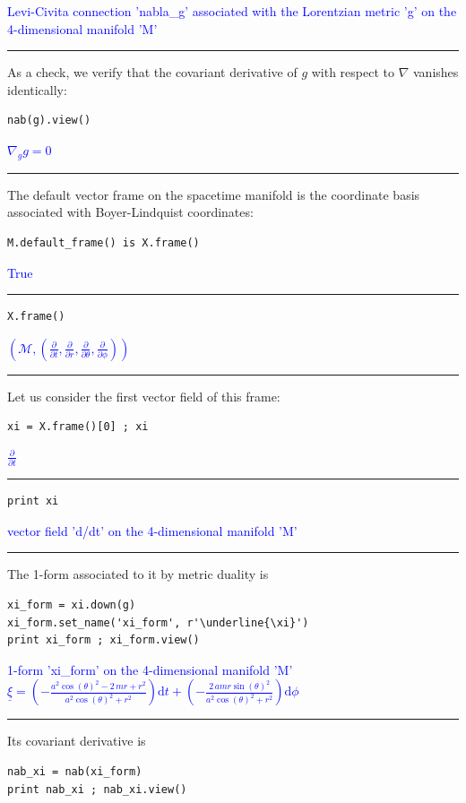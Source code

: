 \documentclass[a4paper]{jpconf}
\newcommand{\soutput}[1]{\textcolor{blue}{#1}\\[-0.8ex]\rule{\textwidth}{0.4pt}}
\begin{document}
\soutput{Levi-Civita connection 'nabla\_g' associated with the Lorentzian metric
'g' on the 4-dimensional manifold 'M'}
As a check, we verify that the covariant derivative of $g$ with respect to
$\nabla$ vanishes identically:
\begin{verbatim}
nab(g).view()
\end{verbatim}
\soutput{$ \nabla_{g} g = 0$}
The default vector frame on the spacetime manifold is the coordinate basis associated with Boyer-Lindquist coordinates:
\begin{verbatim}
M.default_frame() is X.frame()
\end{verbatim}
\soutput{True}
\begin{verbatim}
X.frame()
\end{verbatim}
\soutput{$\left(\mathcal{M} ,\left(\frac{\partial}{\partial t
},\frac{\partial}{\partial r },\frac{\partial}{\partial \theta
},\frac{\partial}{\partial \phi }\right)\right)$}
Let us consider the first vector field of this frame:
\begin{verbatim}
xi = X.frame()[0] ; xi
\end{verbatim}
\soutput{$\frac{\partial}{\partial t}$}
\begin{verbatim}
print xi 
\end{verbatim}
\soutput{vector field 'd/dt' on the 4-dimensional manifold 'M'}
The 1-form associated to it by metric duality is
\begin{verbatim}
xi_form = xi.down(g)
xi_form.set_name('xi_form', r'\underline{\xi}')
print xi_form ; xi_form.view()
\end{verbatim}
\soutput{1-form 'xi\_form' on the 4-dimensional manifold 'M'\\[1ex]
$\underline{\xi} = \left( -\frac{a^{2} \cos\left(\theta\right)^{2} - 2 \,
m r + r^{2}}{a^{2} \cos\left(\theta\right)^{2} + r^{2}} \right)
\mathrm{d} t + \left( -\frac{2 \, a m r
\sin\left(\theta\right)^{2}}{a^{2} \cos\left(\theta\right)^{2} + r^{2}}
\right) \mathrm{d} \phi$}
Its covariant derivative is
\begin{verbatim}
nab_xi = nab(xi_form)
print nab_xi ; nab_xi.view()
\end{verbatim}
\end{document}
